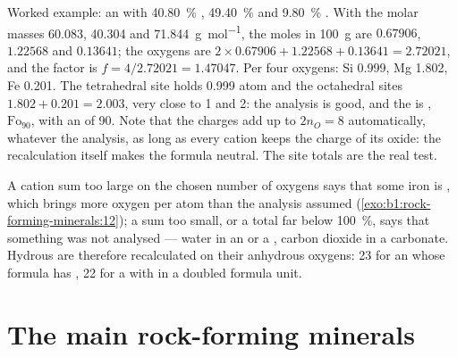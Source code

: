Worked example: an  with \qty{40.80}{\percent} ,
\qty{49.40}{\percent}  and \qty{9.80}{\percent} . With the
molar masses \num{60.083}, \num{40.304} and \qty{71.844}{g.mol^{-1}}, the
moles in \qty{100}{g} are $0.67906$, $1.22568$ and $0.13641$; the
oxygens are $2\times0.67906 + 1.22568 + 0.13641 = 2.72021$, and the factor is
$f = 4/2.72021 = 1.47047$. Per four oxygens: Si \num{0.999}, Mg \num{1.802},
Fe \num{0.201}. The tetrahedral site holds \num{0.999} atom and the
octahedral sites $1.802 + 0.201 = 2.003$, very close to 1 and 2: the analysis
is good, and the  is , $\text{Fo}_{90}$,
with an  of 90. Note that the charges add up to $2n_O = 8$
automatically, whatever the analysis, as long as every cation keeps the charge
of its oxide: the recalculation itself makes the formula neutral. The site
totals are the real test.

A cation sum too large on the chosen number of oxygens says that some iron is
, which brings more oxygen per atom than the analysis assumed
(\cref{exo:b1:rock-forming-minerals:12}); a sum too small, or a total
far below \qty{100}{\percent}, says that something was not analysed --- water
in an  or a , carbon dioxide in a carbonate. Hydrous  are
therefore recalculated on their anhydrous oxygens: 23 for an  whose
formula has , 22 for a  with  in a doubled
formula unit.

\section{The main rock-forming minerals}

